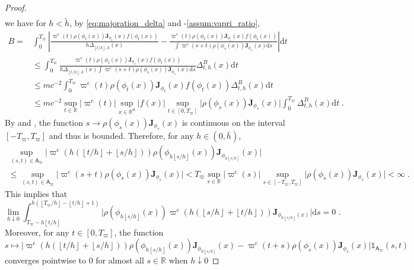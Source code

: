 \documentclass{article}
\def\rmd{\operatorname{d}\hspace{-2pt}}
\def\rset{\mathbb{R}}
\def\rmd{\mathrm{d}}
\def\eqsp{\,}
\def\msa{\mathsf{A}}
\newcommand{\absLigne}[1]{\vert #1 \vert}
\def\eqsp{\;}
\newcommand{\ooint}[1]{\left(#1\right)}
\newcommand{\ccint}[1]{\left[#1\right]}
\newcommand{\1}{\mathds{1}}
\def\proposal{\rho}
\def\Jac{\mathbf{J}}
\newcommand{\JacOp}[1]{\Jac_{#1}}
\def\msa{\mathsf{A}}
\def\rset{\mathbb{R}}
\def\rmd{\mathrm{d}}
\def\varpic{\varpi^{\mathrm{c}}}
\newcommand{\partint}[1]{ \left \lfloor #1 \right \rfloor}
\def\Tvarpi{T_\varpi}
\begin{document}
\begin{proof}
\begin{align}
   \end{align}
   we have for  $h<\tilde h$, by \eqref{eq:majoration_delta} and -\ref{assum:vapri_ratio},
  \begin{align}
\nonumber  B= &\int_0^{\Tvarpi} \left\vert\frac{\varpic(t)\proposal(\phi_t(x))\JacOp{\phi_t}(x) f(\phi_t(x))}{h\Delta_{\partint{t/h},h}(x)} - \frac{\varpic(t)\proposal(\phi_t(x))\JacOp{\phi_t}(x) f(\phi_t(x))}{\int\varpic(s+t)\proposal(\phi_s(x))\JacOp{\phi_s}(x) \rmd s}\right\vert\rmd t \\
 \nonumber &\leq \int_0^{\Tvarpi} \frac{\varpic(t)\proposal(\phi_t(x))\JacOp{\phi_t}(x) f(\phi_t(x))}{h\Delta_{\partint{t/h},h}(x)\int\varpic(s+t)\proposal(\phi_s(x))\JacOp{\phi_s}(x) \rmd s} \Delta^B_{t,h}(x)\rmd t\\
 \nonumber &\leq m c^{-2}\int_0^{\Tvarpi} \varpic(t)\proposal(\phi_t(x))\JacOp{\phi_t}(x) f(\phi_t(x))\Delta^B_{t,h}(x)\rmd t\\
 \label{eq:bound_b}
  &\leq m c^{-2}\sup_{t\in\rset}|\varpic(t)|\sup_{x\in\rset^d}|f(x)|\sup_{t\in[0, \Tvarpi]}\absLigne{\proposal(\phi_s(x))\JacOp{\phi_s}(x)}\int_0^{\Tvarpi}\Delta^B_{t,h}(x)\rmd t\eqsp.
  \end{align}
   By  and , the function $s\to\proposal(\phi_s(x))\JacOp{\phi_s}(x)$ is continuous on the interval $\ccint{-\Tvarpi, \Tvarpi}$ and thus is bounded. Therefore, for any $h\in\ooint{0,\bar h}$, 
\begin{multline}
\label{eq:bound_a_varpi}
\sup_{(s,t)\in\msa_\varpi} \absLigne{\varpic(h(\partint{t/h}+ \partint{s/h}))\proposal(\phi_{h\partint{s/h}}(x))\JacOp{\phi_{h\partint{s/h}}}(x)}\\
\leq \sup_{(s,t)\in\msa_\varpi}\absLigne{\varpic(s+t)\proposal(\phi_s(x))\JacOp{\phi_s}(x)}< \Tvarpi \sup_{s\in\rset}|\varpic(s)|\sup_{s\in[-\Tvarpi, \Tvarpi]}\absLigne{\proposal(\phi_s(x))\JacOp{\phi_s}(x)}<\infty\eqsp.
\end{multline} 
This implies that 
\begin{equation*}
    \lim_{h\downarrow0}\int_{\Tvarpi-h\partint{t/h}}^{h(\partint{\Tvarpi/h}-\partint{t/h}+1)}\vert\proposal(\phi_{h\partint{s/h}}(x))\varpic(h(\partint{s/h} + \partint{t/h})) \JacOp{\phi_{h\partint{s/h}}(x)}\vert\rmd s = 0\eqsp.
\end{equation*}
 Moreover, for any $t\in\ccint{0, \Tvarpi}$, the function $$s\mapsto \vert\varpic(h(\partint{t/h}+ \partint{s/h}))\proposal(\phi_{h\partint{s/h}}(x))\JacOp{\phi_{h\partint{s/h}}}(x)-\varpic(t+s)\proposal(\phi_s(x))\JacOp{\phi_s}(x)\vert\1_{\msa_\varpi}(s,t) $$ converges pointwise to $0$ for almost all $s\in\rset$ when $h\downarrow 0$   

\end{proof}
\end{document}

